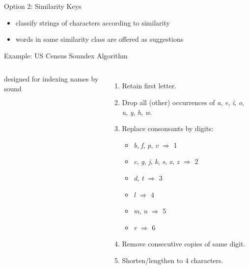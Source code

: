 \documentclass[professionalfonts, xcolor={usenames,svgnames,x11names,table}]{beamer}
\begin{document}
\begin{frame}{Option 2: Similarity Keys}
    \begin{itemize}
        \item classify strings of characters according to similarity
        \item words in same similarity class are offered as suggestions
    \end{itemize}
    \begin{exampleblock}{Example: US Census Soundex Algorithm}
        \begin{columns}

            \quad designed for indexing names by sound

            \begin{enumerate}
                \item Retain first letter.
                \item Drop all (other) occurrences of \emph{a}, \emph{e}, \emph{i}, \emph{o}, \emph{u}, \emph{y}, \emph{h}, \emph{w}.
                \item Replace consonsants by digits:
                    \begin{itemize}
                        \item \emph{b}, \emph{f}, \emph{p}, \emph{v} $\Rightarrow$ 1
                        \item \emph{c}, \emph{g}, \emph{j}, \emph{k}, \emph{s}, \emph{x}, \emph{z} $\Rightarrow$ 2
                        \item \emph{d}, \emph{t} $\Rightarrow$ 3
                        \item \emph{l} $\Rightarrow$ 4
                        \item \emph{m}, \emph{n} $\Rightarrow$ 5
                        \item \emph{r} $\Rightarrow$ 6
                    \end{itemize}
                \item Remove consecutive copies of same digit.
                \item Shorten\slash lengthen to 4 characters.
            \end{enumerate}


\end{columns}
\end{exampleblock}
\end{frame}
\end{document}
